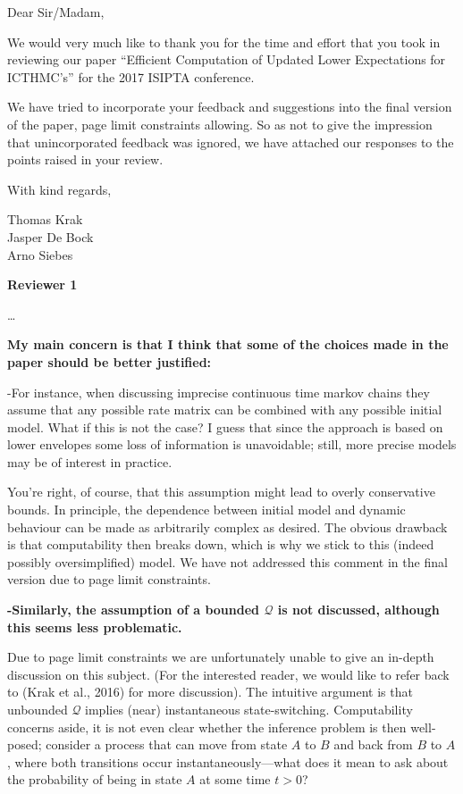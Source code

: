 \documentclass[twoside,11pt]{letter}
\begin{document}
Dear Sir/Madam,

We would very much like to thank you for the time and effort that you took in reviewing our paper ``Efficient Computation of Updated Lower Expectations for ICTHMC's'' for the 2017 ISIPTA conference.

We have tried to incorporate your feedback and suggestions into the final version of the paper, page limit constraints allowing. So as not to give the impression that unincorporated feedback was ignored, we have attached our responses to the points raised in your review.

With kind regards,

Thomas Krak\\
Jasper De Bock\\
Arno Siebes
\newline\newline

\newpage
{\bf Reviewer 1}

\ldots \\
{\bf 
My main concern is that I think that some of the choices made in the paper should be better justified: 

-For instance, when discussing imprecise continuous time markov chains they assume that any possible rate matrix can be combined with any possible initial model. What if this is not the case? I guess that since the approach is based on lower envelopes some loss of information is unavoidable; still, more precise models may be of interest in practice. }

You're right, of course, that this assumption might lead to overly conservative bounds. In principle, the dependence between initial model and dynamic behaviour can be made as arbitrarily complex as desired. The obvious drawback is that computability then breaks down, which is why we stick to this (indeed possibly oversimplified) model. We have not addressed this comment in the final version due to page limit constraints.

{\bf 
-Similarly, the assumption of a bounded $\mathcal{Q}$ is not discussed, although this seems less problematic. }

Due to page limit constraints we are unfortunately unable to give an in-depth discussion on this subject. (For the interested reader, we would like to refer back to (Krak et al., 2016) for more discussion). The intuitive argument is that unbounded $\mathcal{Q}$ implies (near) instantaneous state-switching. Computability concerns aside, it is not even clear whether the inference problem is then well-posed; consider a process that can move from state $A$ to $B$ and back from $B$ to $A$, where both transitions occur instantaneously---what does it mean to ask about the probability of being in state $A$ at some time $t>0$?
\end{document}
